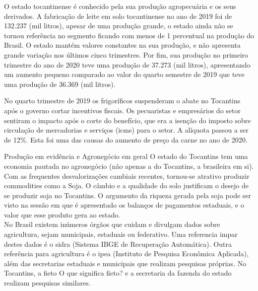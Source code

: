 \par O estado tocantinense é conhecido pela sua produção agropecuária e os seus derivados. A fabricação de leite em solo tocantinense no ano de 2019 foi de 132.237 (mil litros), apesar de uma produção grande, o estado ainda não se tornou referência no segmento ficando com menos de 1 percentual na produção do Brasil. O estado mantém valores constantes na sua produção, e não apresenta grande variação nos últimos cinco trimestres. Por fim, sua produção no primeiro trimestre do ano de 2020 teve uma produção de 37.273 (mil litros), apresentando um aumento pequeno comparado ao valor do quarto semestre de 2019 que teve uma produção de 36.369 (mil litros).


\par No quarto trimestre de 2019 os frigoríficos suspenderam o abate no Tocantins após o governo cortar incentivos fiscais. Os pecuaristas e empresários do setor sentiram o impacto após o corte do benefício, que era a isenção do imposto sobre circulação de mercadorias e serviços (\acrshort{icms}) para o setor. A alíquota passou a ser de 12\%. Esta foi uma das causas do aumento de preço da carne no ano de 2020.

\begin{smbox}[label={labelbox},nameref={Agricultura}]{Produção em evidência e Agronegócio em geral}
	O estado do Tocantins tem uma economia pautada no agronegócio (não apenas a do Tocantins, a brasileira em si). Com as frequentes desvalorizações cambiais recentes, tornou-se atrativo produzir commodities como a Soja. O câmbio e a qualidade do solo justificam o desejo de se produzir soja no Tocantins. O argumento da riqueza gerada pela soja pode ser visto na sessão em que é apresentado os balanços de pagamentos estaduais, e o valor que esse produto gera ao estado.
\\
	No Brasil existem inúmeros órgãos que cuidam e divulgam dados sobre agricultura, sejam municipais, estaduais ou federativo. Uma referencia impar destes dados é o \acrshort{sidra} (Sistema IBGE de Recuperação Automática). Outra referência para agricultura é o \acrshort{ipea} (Instituto de Pesquisa Econômica Aplicada), além das secretarias estaduais e municipais que realizam pesquisas próprias. No Tocantins, a \acrshort{fieto} {\color{red}O que significa fieto?} e a secretaria da fazenda do estado realizam pesquisas similares.
\end{smbox}

